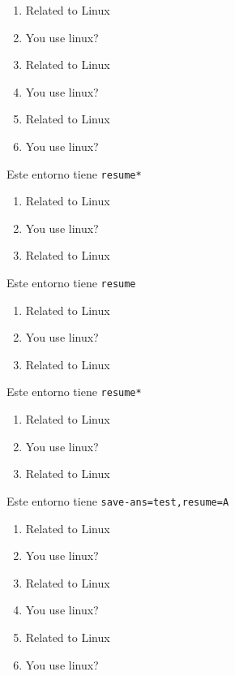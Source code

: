\documentclass{article}
\begin{document}
\begin{enumerate}[resume=A]
  \item Related to Linux
  \item You use linux? %
  \item Related to Linux
  \item You use linux? %
  \item Related to Linux
  \item You use linux? %
\end{enumerate}

Este entorno tiene \verb+resume*+

\begin{enumerate}[resume*]
  \item Related to Linux
  \item You use linux? %
  \item Related to Linux
\end{enumerate}


Este entorno tiene \verb+resume+

\begin{enumerate}[resume]
  \item Related to Linux
  \item You use linux? %
  \item Related to Linux
\end{enumerate}

Este entorno tiene \verb+resume*+

\begin{enumerate}[resume*]
  \item Related to Linux
  \item You use linux? %
  \item Related to Linux
\end{enumerate}

Este entorno tiene \verb+save-ans=test,resume=A+

\begin{enumerate}[resume=A]
  \item Related to Linux
  \item You use linux? %
  \item Related to Linux
  \item You use linux? %
  \item Related to Linux
  \item You use linux? %
\end{enumerate}
\end{document}
